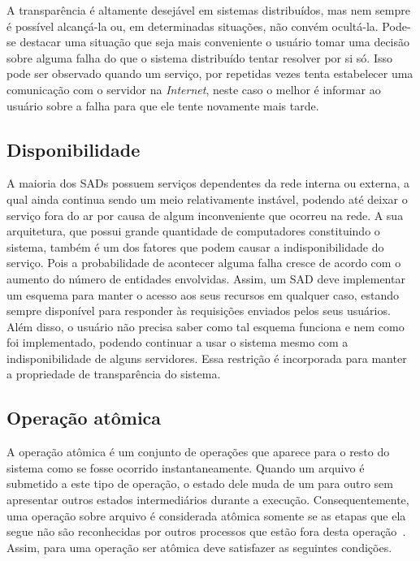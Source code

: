 	A transparência é altamente desejável em sistemas distribuídos, mas nem sempre é possível alcançá-la ou, em determinadas situações, não convém ocultá-la. Pode-se destacar uma situação que seja mais conveniente o usuário tomar uma decisão sobre alguma falha do que o sistema distribuído tentar resolver por si só. Isso pode ser observado quando um serviço, por repetidas vezes tenta estabelecer uma comunicação com o servidor na \textit{Internet}, neste caso o melhor é informar ao usuário sobre a falha para que ele tente novamente mais tarde.
	\\
	
	\subsection{Disponibilidade}
	A maioria dos SADs possuem serviços dependentes da rede interna ou externa, a qual ainda continua sendo um meio relativamente instável, podendo até deixar o serviço fora do ar por causa de algum inconveniente que ocorreu na rede. A sua arquitetura, que possui grande quantidade de computadores constituindo o sistema, também é um dos fatores que podem causar a indisponibilidade do serviço. Pois a probabilidade de acontecer alguma falha cresce de acordo com o aumento do número de entidades envolvidas.  
	Assim, um SAD deve implementar um esquema para manter o acesso aos seus recursos em qualquer caso, estando sempre disponível para responder às requisições enviados pelos seus usuários. Além disso, o usuário não precisa saber como tal esquema funciona e nem como foi implementado, podendo continuar a usar o sistema mesmo com a indisponibilidade de alguns servidores. Essa restrição é incorporada para manter a propriedade de transparência do sistema.
	\\
	
	\subsection{Operação atômica}
	A operação atômica é um conjunto de operações que aparece para o resto do sistema como se fosse ocorrido instantaneamente.
	Quando um arquivo é submetido a este tipo de operação, o estado dele muda de um para outro sem apresentar outros estados intermediários durante a execução.
	Consequentemente, uma operação sobre arquivo é considerada atômica somente se as etapas que ela segue não são reconhecidas por outros processos que estão fora desta operação~\cite{tanenbaum07_2}. 
	Assim, para uma operação ser atômica deve satisfazer as seguintes condições.
	
